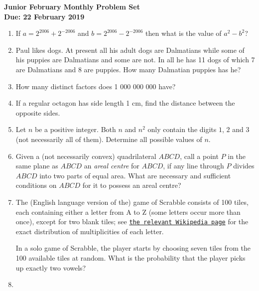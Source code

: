 \documentclass{article}
\begin{document}
\begin{center}
\textbf{\Large Junior February Monthly Problem Set}
\\ \vspace{1em}
\textbf{\large Due: 22 February 2019}
\end{center}

\vspace{12pt}

\begin{enumerate}[1.]

\item %
If $a = 2^{2006} + 2^{-2006}$ and $b = 2^{2006} - 2^{-2006}$ then what is the value of $a^2 - b^2$?


\item %
Paul likes dogs. At present all his adult dogs are Dalmatians while some of his puppies are Dalmatians and some are not. In all he has 11 dogs of which 7 are Dalmatians and 8 are puppies. How many Dalmatian puppies has he?


\item %
How many distinct factors does 1 000 000 000 have?


\item %
If a regular octagon has side length 1 cm, find the distance between the opposite sides.


\item %
Let $n$ be a positive integer. Both $n$ and $n^2$ only contain the digits $1$, $2$ and $3$ (not necessarily all of them). Determine all possible values of $n$.


\item %
Given a (not necessarily convex) quadrilateral $ABCD$, call a point $P$ in the same plane as $ABCD$ an \emph{areal centre} for $ABCD$, if any line through $P$ divides $ABCD$ into two parts of equal area. What are necessary and sufficient conditions on $ABCD$ for it to possess an areal centre?


\item %
The (English language version of the) game of Scrabble\texttrademark{} consists of 100 tiles, each containing either a letter from A to Z (some letters occur more than once), except for two blank tiles; see \href{https://en.wikipedia.org/wiki/Scrabble_letter_distributions#English}{\texttt{the relevant Wikipedia page}} for the exact distribution of multiplicities of each letter.

In a solo game of Scrabble, the player starts by choosing seven tiles from the 100 available tiles at random. What is the probability that the player picks up exactly two vowels?


\item %


\end{enumerate}
\end{document}
